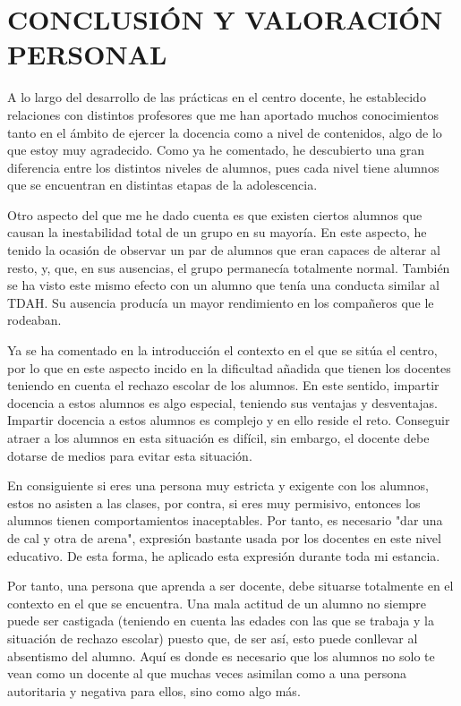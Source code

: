 \documentclass[spanish,12pt, a4paper,twoside]{paper}
\let\oldsection\section
\def\section{\cleardoublepage\oldsection}
\begin{document}
\section{CONCLUSIÓN Y VALORACIÓN PERSONAL} %

A lo largo del desarrollo de las prácticas en el centro docente, he establecido relaciones con distintos profesores que me han aportado muchos conocimientos tanto en el ámbito de ejercer la docencia como a nivel de contenidos, algo de lo que estoy muy agradecido. Como ya he comentado, he descubierto una gran diferencia entre los distintos niveles de alumnos, pues cada nivel tiene alumnos que se encuentran en distintas etapas de la adolescencia. 

Otro aspecto del que me he dado cuenta es que existen ciertos alumnos que causan la inestabilidad total de un grupo en su mayoría. En este aspecto, he tenido la ocasión de observar un par de alumnos que eran capaces de alterar al resto, y, que, en sus ausencias, el grupo permanecía totalmente normal. También se ha visto este mismo efecto con un alumno que tenía una conducta similar al TDAH. Su ausencia producía un mayor rendimiento en los compañeros que le rodeaban.

Ya se ha comentado en la introducción el contexto en el que se sitúa el centro, por lo que en este aspecto incido en la dificultad añadida que tienen los docentes teniendo en cuenta el rechazo escolar de los alumnos. En este sentido, impartir docencia a estos alumnos es algo especial, teniendo sus ventajas y desventajas. Impartir docencia a estos alumnos es complejo y en ello reside el reto. Conseguir atraer a los alumnos en esta situación es difícil, sin embargo, el docente debe dotarse de medios para evitar esta situación. 

En consiguiente si eres una persona muy estricta y exigente con los alumnos, estos no asisten a las clases, por contra, si eres muy permisivo, entonces los alumnos tienen comportamientos inaceptables. Por tanto, es necesario "dar una de cal y otra de arena", expresión bastante usada por los docentes en este nivel educativo. De esta forma, he aplicado esta expresión durante toda mi estancia. 

Por tanto, una persona que aprenda a ser docente, debe situarse totalmente en el contexto en el que se encuentra. Una mala actitud de un alumno no siempre puede ser castigada (teniendo en cuenta las edades con las que se trabaja y la situación de rechazo escolar) puesto que, de ser así, esto puede conllevar al absentismo del alumno. Aquí es donde es necesario que los alumnos no solo te vean como un docente al que muchas veces asimilan como a una persona autoritaria y negativa para ellos, sino como algo más. 
\end{document}
